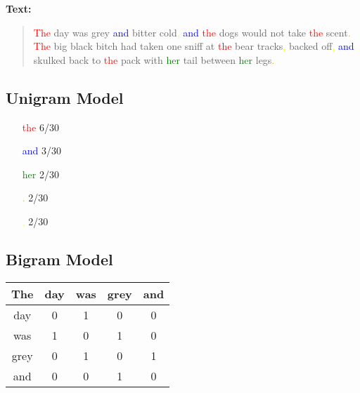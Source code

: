 \textbf {Text:}
\begin{quote}
\textcolor{red}{The} day was grey \textcolor{blue}{and} bitter cold\textcolor{yellow}{,} \textcolor{blue}{and} \textcolor{red}{the} dogs would not take \textcolor{red}{the} scent\textcolor{orange}{.} \textcolor{red}{The} big black bitch had taken one sniff at \textcolor{red}{the} bear tracks\textcolor{yellow}{,} backed oﬀ\textcolor{yellow}{,} \textcolor{blue}{and} skulked back to \textcolor{red}{the} pack with \textcolor{green}{her} tail between \textcolor{green}{her} legs\textcolor{orange}{.}
\end{quote}
\subsection{Unigram Model}
\begin{itemize}
	\item [\textcolor{red}{the}] 6/30
	\item [\textcolor{blue}{and}] 3/30
	\item [\textcolor{green}{her}] 2/30
	\item [\textcolor{orange}{.}] 2/30
	\item [\textcolor{yellow}{,}] 2/30
\end{itemize}
\subsection{Bigram Model}
\begin{tabular}{||c ||c c c c|}
\hline
The	& day & was & grey & and\\
\hline
\hline
day & 0 & 1 & 0 & 0\\
was & 1 & 0 & 1 & 0\\
grey & 0 & 1 & 0 & 1 \\
and & 0 & 0 & 1& 0\\
\hline
\end{tabular}


